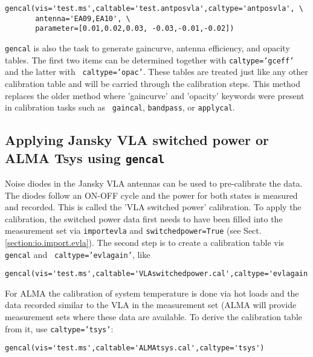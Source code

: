 \small
\begin{verbatim}
gencal(vis='test.ms',caltable='test.antposvla',caltype='antposvla', \
       antenna='EA09,EA10', \
       parameter=[0.01,0.02,0.03, -0.03,-0.01,-0.02])
\end{verbatim}
\normalsize

{\tt gencal} is also the task to generate gaincurve, antenna
efficiency, and opacity tables. The first two items can be determined
together with {\tt caltype='gceff'} and the latter with {\tt
  caltype='opac'}. These tables are treated just like any other
calibration table and will be carried through the calibration
steps. This method replaces the older method where 'gaincurve' and
'opacity' keywords were present in calibration tasks such as {\tt
  gaincal}, {\tt bandpass}, or {\tt applycal}.



\subsection{Applying Jansky VLA switched power  or ALMA Tsys
   using {\tt gencal}}
\label{section:cal.prior.gencalevlagains}
Noise diodes in the Jansky VLA antennas can be used to pre-calibrate the
data. The diodes follow an ON-OFF cycle and the power for both states is
measured and recorded. This is called the 'VLA switched power'
calibration. To apply the calibration, the switched power data first
needs to have been
filled into the measurement set via {\tt importevla} and {\tt switchedpower=True}
(see Sect.\,\ref{section:io.import.evla}). The second step is to
create a calibration table vis {\tt gencal} and {\tt
  caltype='evlagain'}, like 

\small
\begin{verbatim}
gencal(vis='test.ms',caltable='VLAswitchedpower.cal',caltype='evlagain')
\end{verbatim}
\normalsize

For ALMA the calibration of system temperature is done via hot loads
and the data recorded similar to the VLA in the measurement set (ALMA
will provide measurement sets where these data are available. To
derive the calibration table from it, use {\tt caltype='tsys'}:

\small
\begin{verbatim}
gencal(vis='test.ms',caltable='ALMAtsys.cal',caltype='tsys')
\end{verbatim}
\normalsize


